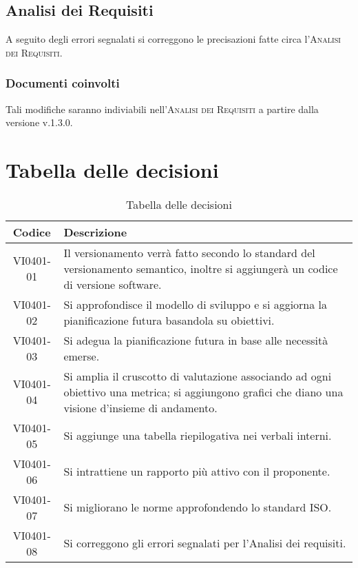 \documentclass{article}
\begin{document}
\subsection{Analisi dei Requisiti}
\label{itm:8}

A seguito degli errori segnalati si correggono le precisazioni fatte circa l'\textsc{Analisi dei Requisiti}.
\subsubsection*{Documenti coinvolti}
Tali modifiche saranno indiviabili nell'\textsc{Analisi dei Requisiti} a partire dalla versione v.1.3.0.

\newpage
\section{Tabella delle decisioni}%
\label{sub:decisioni}

\begin{table}[!ht]
	\centering
	\begin{tabular}{|c|p{13cm}|}
		\hline
		\rowcolor{lightgray}
		\textbf{Codice} & \textbf{Descrizione} \\ 
		\hline
			VI0401-01 & Il versionamento verrà fatto secondo lo standard del versionamento semantico, inoltre si aggiungerà un codice di versione software. \\
			VI0401-02 & Si approfondisce il modello di sviluppo e si aggiorna la pianificazione futura basandola su obiettivi. \\
            VI0401-03 & Si adegua la pianificazione futura in base alle necessità emerse. \\
            VI0401-04 & Si amplia il cruscotto di valutazione associando ad ogni obiettivo una metrica; si aggiungono grafici che diano una visione d'insieme di andamento. \\
            VI0401-05 & Si aggiunge una tabella riepilogativa nei verbali interni. \\
            VI0401-06 & Si intrattiene un rapporto più attivo con il proponente. \\
            VI0401-07 & Si migliorano le norme approfondendo lo standard ISO. \\
            VI0401-08 & Si correggono gli errori segnalati per l'Analisi dei requisiti.  \\
		\hline
	\end{tabular}
	\caption{Tabella delle decisioni}
\end{table}
\end{document}
